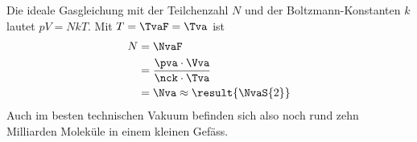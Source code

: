 Die ideale Gasgleichung mit der Teilchenzahl $N$ und der Boltzmann-Konstanten $k$ lautet $pV = NkT$. Mit $T = \TvaF = \Tva$ ist
\begin{align}
 N &= \NvaF \\
   &= \frac{\pva\cdot\Vva}{\nck\cdot\Tva} \\
   &= \Nva \approx \result{\NvaS{2}}
\end{align}
Auch im besten technischen Vakuum befinden sich also noch rund zehn Milliarden Moleküle in einem kleinen Gefäss.
